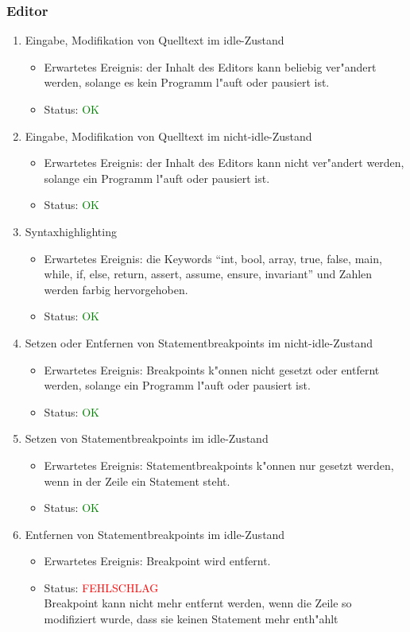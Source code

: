 \subsubsection{Editor}
\begin{enumerate}
\item Eingabe, Modifikation von Quelltext im idle-Zustand
\begin{itemize}
\item Erwartetes Ereignis: der Inhalt des Editors kann beliebig ver"andert werden, solange es kein Programm l"auft oder pausiert ist. 
\item Status: \textcolor{green}{OK}
\end{itemize}
\item Eingabe, Modifikation von Quelltext im nicht-idle-Zustand
\begin{itemize}
\item Erwartetes Ereignis: der Inhalt des Editors kann nicht ver"andert werden, solange ein Programm l"auft oder pausiert ist. 
\item Status: \textcolor{green}{OK}
\end{itemize}
\item Syntaxhighlighting
\begin{itemize}
\item Erwartetes Ereignis: die Keywords "`int, bool, array, true, false, main, while, if, else, return, assert, assume, ensure, invariant"' und Zahlen werden farbig hervorgehoben. 
\item Status: \textcolor{green}{OK}
\end{itemize}
\item Setzen oder Entfernen von Statementbreakpoints im nicht-idle-Zustand
\begin{itemize}
\item Erwartetes Ereignis: Breakpoints k"onnen nicht gesetzt oder entfernt werden, solange ein Programm l"auft oder pausiert ist. 
\item Status: \textcolor{green}{OK}
\end{itemize}
\item Setzen von Statementbreakpoints im idle-Zustand
\begin{itemize}
\item Erwartetes Ereignis: Statementbreakpoints k"onnen nur gesetzt werden, wenn in der Zeile ein Statement steht.
\item Status: \textcolor{green}{OK}
\end{itemize}
\item Entfernen von Statementbreakpoints im idle-Zustand
\begin{itemize}
\item Erwartetes Ereignis: Breakpoint wird entfernt.
\item Status: \textcolor{red}{FEHLSCHLAG} \\
Breakpoint kann nicht mehr entfernt werden, wenn die Zeile so modifiziert wurde, dass sie keinen Statement mehr enth"ahlt
\end{itemize}
\end{enumerate}

